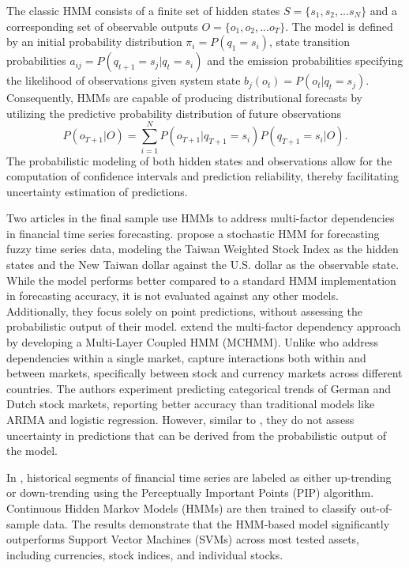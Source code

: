 The classic HMM consists of a finite set of hidden states $S = \{s_1, s_2, ... s_N\}$ and a corresponding set of observable outputs $O = \{o_1, o_2, ... o_T\}$. The model is defined by an initial probability distribution $\pi_i = P(q_1 = s_i)$, state transition probabilities $a_{ij} = P(q_{t+1} = s_j|q_t = s_i)$ and the emission probabilities specifying the likelihood of observations given system state $b_j(o_t) = P(o_t|q_t=s_j)$. Consequently, HMMs are capable of producing distributional forecasts by utilizing the predictive probability distribution of future observations
\begin{equation}
        P(o_{T+1}|O) = \sum_{i=1}^{N}P(o_{T+1}|q_{T+1} = s_i)P(q_{T+1} = s_i | O).
\end{equation}
The probabilistic modeling of both hidden states and observations allow for the computation of confidence intervals and prediction reliability, thereby facilitating uncertainty estimation of predictions. 

Two articles in the final sample use HMMs to address multi-factor dependencies in financial time series forecasting. \textcite{li2010stochastic} propose a stochastic HMM for forecasting fuzzy time series data, modeling the Taiwan Weighted Stock Index as the hidden states and the New Taiwan dollar against the U.S. dollar as the observable state. While the model performs better compared to a standard HMM implementation in forecasting accuracy, it is not evaluated against any other models. Additionally, they focus solely on point predictions, without assessing the probabilistic output of their model. \textcite{cao2019multi} extend the multi-factor dependency approach by developing a Multi-Layer Coupled HMM (MCHMM). Unlike \textcite{li2010stochastic} who address dependencies within a single market, \textcite{cao2019multi} capture interactions both within and between markets, specifically between stock and currency markets across different countries. The authors experiment predicting categorical trends of German and Dutch stock markets, reporting better accuracy than traditional models like ARIMA and logistic regression. However, similar to \textcite{li2010stochastic}, they  do not assess uncertainty in predictions that can be derived from the probabilistic output of the model.

In \textcite{park2011trend}, historical segments of financial time series are labeled as either up-trending or down-trending using the Perceptually Important Points (PIP) algorithm. Continuous Hidden Markov Models (HMMs) are then trained to classify out-of-sample data. The results demonstrate that the HMM-based model significantly outperforms Support Vector Machines (SVMs) across most tested assets, including currencies, stock indices, and individual stocks.

